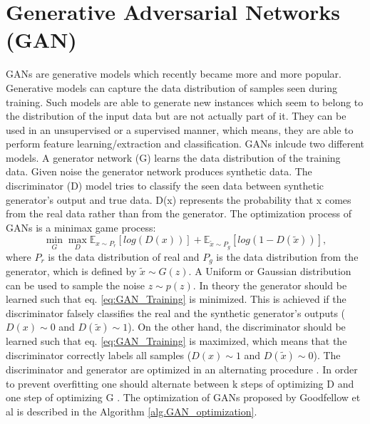 \section{Generative Adversarial Networks (GAN)}
GANs are generative models which recently became more and more popular. Generative models can capture the data distribution of samples seen during training. Such models are able to generate new instances which seem to belong to the distribution of the input data but are not actually part of it. They can be used in an unsupervised or a supervised manner, which means, they are able to perform feature learning/extraction and classification. GANs inlcude two different models. A generator network (G) learns the data distribution of the training data. Given noise the generator network produces synthetic data. The discriminator (D) model tries to classify the seen data between synthetic generator's output and true data. D(x) represents the probability that x comes from the real data rather than from the generator. The optimization process of GANs is a minimax game process:
\begin{equation}
    \min_{G} \max_{D} \mathbb{E}_{x \sim P_{r}} [log(D(x))] + \mathbb{E}_{\tilde{x} \sim P_{g}}[log(1-D(\tilde{x}))],
    \label{eq:GAN_Training}
\end{equation}
where $P_{r}$ is the data distribution of real and $P_{g}$ is the data distribution from the generator, which is defined by  $\tilde{x}  \sim G(z)$. A Uniform or Gaussian distribution can be used to sample the noise $z \sim p(z)$. In theory the generator should be learned such that eq. \ref{eq:GAN_Training} is minimized. This is achieved if the discriminator falsely classifies the real and the synthetic generator's outputs ($D(x) \sim 0$ and $D(\tilde{x}) \sim 1$). On the other hand, the discriminator should be learned such that eq. \ref{eq:GAN_Training} is maximized, which means that the discriminator correctly labels all samples ($D(x) \sim 1$ and $D(\tilde{x}) \sim 0$). The discriminator and generator are optimized in an alternating procedure \cite{Goodfellow2014}. In order to prevent overfitting one should alternate between k steps of optimizing D and one step of optimizing G \cite{Goodfellow2014}. The optimization of GANs proposed by Goodfellow et al \cite{Goodfellow2014} is described in the Algorithm \ref{alg.GAN_optimization}.

